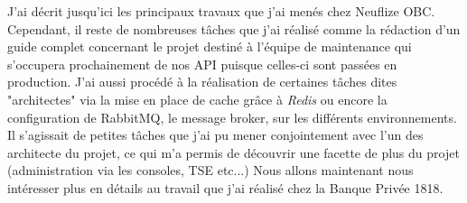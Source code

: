 	J'ai décrit jusqu'ici les principaux travaux que j'ai menés chez Neuflize OBC. Cependant, il reste de nombreuses tâches que j'ai réalisé comme la rédaction d'un guide complet concernant le projet destiné à l'équipe de maintenance qui s'occupera prochainement de nos API puisque celles-ci sont passées en production. J'ai aussi procédé à la réalisation de certaines tâches dites "architectes" via la mise en place de cache grâce à \textit{Redis} ou encore la configuration de RabbitMQ, le message broker, sur les différents environnements. Il s'agissait de petites tâches que j'ai pu mener conjointement avec l'un des architecte du projet, ce qui m'a permis de découvrir une facette de plus du projet (administration via les consoles, TSE etc...) Nous allons maintenant nous intéresser plus en détails au travail que j'ai réalisé chez la Banque Privée 1818.